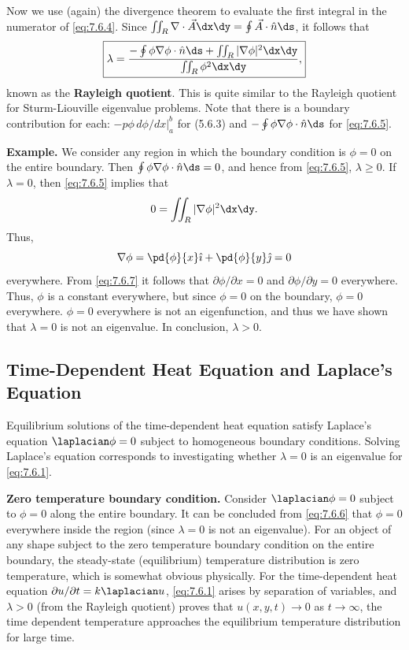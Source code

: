 Now we use (again) the divergence theorem to evaluate the first integral in the numerator of \eqref{eq:7.6.4}.  Since $\iint_R \nabla\cdot\vec{A}\dx\dy = \oint\vec{A}\cdot\hat{n}\ds$, it follows that
\begin{equation}
\boxed{\lambda = \frac{-\oint\phi\nabla\phi\cdot\hat{n}\ds + \iint_R |\nabla\phi|^2\dx\dy}{\iint_R \phi^2\dx\dy},}
\label{eq:7.6.5}
\end{equation}
known as the \textbf{Rayleigh quotient}.  This is quite similar to the Rayleigh quotient for Sturm-Liouville eigenvalue problems.  Note that there is a boundary contribution for each: $-p\phi\,d\phi/dx\big|_a^b$ for (5.6.3) and $-\oint\phi\nabla\phi\cdot\hat{n}\ds$ for \eqref{eq:7.6.5}.

\textbf{Example.}  We consider any region in which the boundary condition is $\phi = 0$ on the entire boundary.  Then $\oint\phi\nabla\phi\cdot\hat{n}\ds = 0$, and hence from \eqref{eq:7.6.5}, $\lambda \geq 0$.  If $\lambda = 0$, then \eqref{eq:7.6.5} implies that
\begin{equation}
0 = \iint_R |\nabla\phi|^2\dx\dy.
\label{eq:7.6.6}
\end{equation}
Thus,
\begin{equation}
\nabla\phi = \pd{\phi}{x}\hat{\imath} + \pd{\phi}{y}\hat{\jmath} = 0
\label{eq:7.6.7}
\end{equation}
everywhere.  From \eqref{eq:7.6.7} it follows that $\partial\phi/\partial x = 0$ and $\partial\phi/\partial y = 0$ everywhere.  Thus, $\phi$ is a constant everywhere, but since $\phi = 0$ on the boundary, $\phi = 0$ everywhere.  $\phi = 0$ everywhere is not an eigenfunction, and thus we have shown that $\lambda = 0$ is not an eigenvalue.  In conclusion, $\lambda > 0$.

\subsection{Time-Dependent Heat Equation and Laplace's Equation}
\label{sec:7.6.2}

Equilibrium solutions of the time-dependent heat equation satisfy Laplace's equation $\laplacian\phi = 0$ subject to homogeneous boundary conditions.  Solving Laplace's equation corresponds to investigating whether $\lambda = 0$ is an eigenvalue for \eqref{eq:7.6.1}.

\textbf{Zero temperature boundary condition.}  Consider $\laplacian\phi = 0$ subject to $\phi = 0$ along the entire boundary.  It can be concluded from \eqref{eq:7.6.6} that $\phi = 0$ everywhere inside the region (since $\lambda = 0$ is not an eigenvalue).  For an object of any shape subject to the zero temperature boundary condition on the entire boundary, the steady-state (equilibrium) temperature distribution is zero temperature, which is somewhat obvious physically.  For the time-dependent heat equation $\partial u/\partial t = k\laplacian u$, \eqref{eq:7.6.1} arises by separation of variables, and $\lambda > 0$ (from the Rayleigh quotient) proves that $u(x,y,t) \to 0$ as $t \to \infty$, the time dependent temperature approaches the equilibrium temperature distribution for large time.

